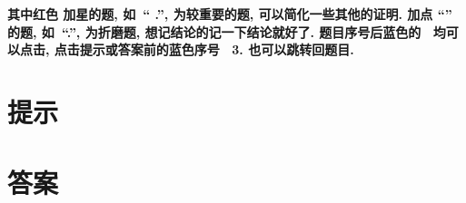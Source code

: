 \documentclass{ctexart}
\begin{document}
{\bfseries 其中\ifprint \else 红色 \fi 加星的题, 如\  ``{\bfseries\ifprint \else \color{red} .}'',  为较重要的题, 可以简化一些其他的证明. 加点 ``\textbullet'' 的题, 如\ ``{\bfseries{}.}'', 为折磨题, 想记结论的记一下结论就好了. \ifprint \else 题目序号后蓝色的\ {\color{blue}\mdseries [提示] [答案]} 均可以点击, 点击提示或答案前的蓝色序号\ {\color{blue} 3.} 也可以跳转回题目.\fi}



\section{提示}

\printhint

\section{答案}

\printanswer


\end{document}
